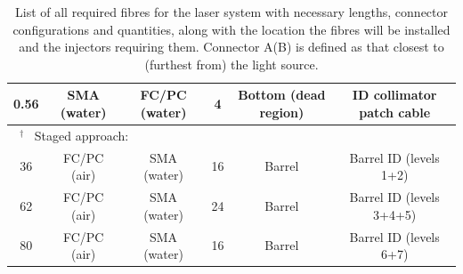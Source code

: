 \documentclass[a4paper,11pt]{article}
\providecommand{\DIFaddendFL}{} %
\DeclareRobustCommand{\DIFaddendFL}{\DIFOaddendFL \let\includegraphics\DIFOincludegraphics} %
\begin{document}
\begin{table}[h]
{\begin{tabular}{cccccc}
0.56		&	SMA (water)		&	FC/PC (water)		&	4				&	Bottom (dead region)	& ID collimator patch cable	\\ \midrule
\multicolumn{3}{l}{\mbox{%
$^\dagger$
}%
Staged approach:}			&					&			\\
36			&	FC/PC (air)		&	SMA (water)		&	16				&	Barrel	&	Barrel ID (levels 1+2) \\
62			&	FC/PC (air)			&	SMA (water)		&	24				&	Barrel	&	Barrel ID (levels 3+4+5)	\\
80			&	FC/PC (air)			&	SMA (water)		&	16				&	Barrel	&	Barrel ID (levels 6+7)	\\
\bottomrule
\end{tabular}
}
\DIFaddendFL \caption{List of all required fibres for the laser system with necessary lengths, connector configurations and quantities, along with the location the fibres will be installed and the injectors requiring them. Connector A(B) is defined as that closest to (furthest from) the light source.}\label{tab:fibreDetailsLaser}
\end{table}
\end{document}
